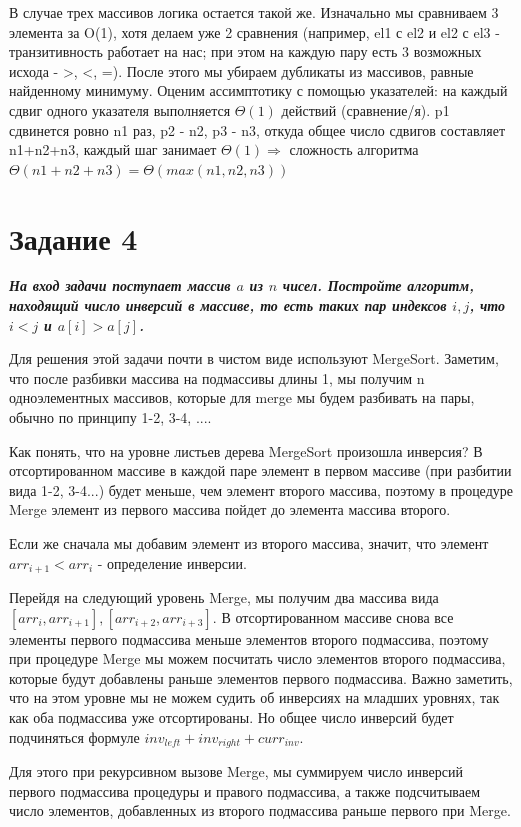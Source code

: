 \documentclass{article}
\begin{document}
В случае трех массивов логика остается такой же. Изначально мы сравниваем 3 элемента за O(1), хотя делаем уже 2 сравнения (например, el1 с el2 и el2 с el3 - транзитивность работает на нас; при этом на каждую пару есть 3 возможных исхода - >, <, =). После этого мы убираем дубликаты из массивов, равные найденному минимуму. Оценим ассимптотику с помощью указателей: на каждый сдвиг одного указателя выполняется $\Theta(1)$ действий (сравнение/я). p1 сдвинется ровно n1 раз, p2 - n2, p3 - n3, откуда общее число сдвигов составляет n1+n2+n3, каждый шаг занимает $\Theta(1) \Rightarrow$ сложность алгоритма $\Theta(n1 + n2 + n3) = \Theta(max(n1,n2,n3))$




\section*{\textbf{Задание 4}} \textbf{\textit{На вход задачи поступает массив $a$ из $n$ чисел. Постройте алгоритм, находящий число инверсий в массиве, то есть таких пар индексов $i, j$, что $i < j$ и $a[i] > a[j]$.}}

Для решения этой задачи почти в чистом виде используют MergeSort. Заметим, что после разбивки массива на подмассивы длины 1, мы получим n одноэлементных массивов, которые для merge мы будем разбивать на пары, обычно по принципу 1-2, 3-4, .... 

Как понять, что на уровне листьев дерева MergeSort произошла инверсия? В отсортированном массиве в каждой паре элемент в первом массиве (при разбитии вида 1-2, 3-4...) будет меньше, чем элемент второго массива, поэтому в процедуре Merge элемент из первого массива пойдет до элемента массива второго.

Если же сначала мы добавим элемент из второго массива, значит, что элемент $arr_{i+1} < arr_i$ - определение инверсии.

Перейдя на следующий уровень Merge, мы получим два массива вида $[arr_{i}, arr_{i+1}], [arr_{i+2}, arr_{i+3}]$. В отсортированном массиве снова все элементы первого подмассива меньше элементов второго подмассива, поэтому при процедуре Merge мы можем посчитать число элементов второго подмассива, которые будут добавлены раньше элементов первого подмассива. Важно заметить, что на этом уровне мы не можем судить об инверсиях на младших уровнях, так как оба подмассива уже отсортированы. Но общее число инверсий будет подчиняться формуле $inv_{left} + inv_{right} + curr_{inv}$.

Для этого при рекурсивном вызове Merge, мы суммируем число инверсий первого подмассива процедуры и правого подмассива, а также подсчитываем число элементов, добавленных из второго подмассива раньше первого при Merge. 
\end{document}
